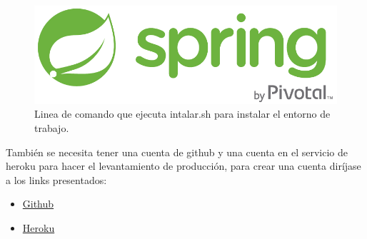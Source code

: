 \begin{figure}[!h]
  \centering
  \includegraphics[width=0.1\linewidth]{images/tecnologias/spring.png}
  \caption{Linea de comando que ejecuta intalar.sh para instalar el entorno de trabajo.}
\end{figure}


También se necesita tener una cuenta de github y una cuenta en el servicio de heroku para hacer el levantamiento de producción, para crear una cuenta diríjase a los links presentados:
\begin{itemize}
  \item \href{https://codigofacilito.com/articulos/como-crear-una-cuenta-y-un-repo-en-github}{Github}
  \item \href{https://signup.heroku.com/dc}{Heroku}
\end{itemize}
